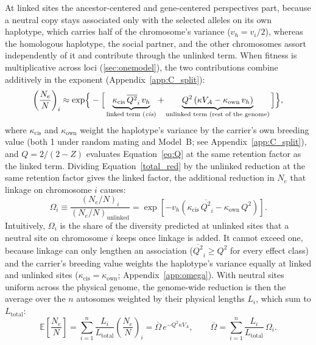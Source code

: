 \documentclass{article}
\begin{document}
At linked sites the ancestor-centered and gene-centered perspectives part, because a neutral copy stays associated only with the selected alleles on its own haplotype, which carries half of the chromosome's variance ($v_h = v_i/2$), whereas the homologous haplotype, the social partner, and the other chromosomes assort independently of it and contribute through the unlinked term. When fitness is multiplicative across loci (\autoref{sec:onemodel}), the two contributions combine additively in the exponent (Appendix~\ref{app:C_split}):
\begin{equation}
    \left(\frac{N_e}{N}\right)_i \approx \exp\!\Big\{-\Big[\underbrace{\kappa_\text{cis}\,\overline{Q^2}_i\,v_h}_{\text{linked term (\textit{cis})}} + \underbrace{Q^2\left(\kappa V_A - \kappa_\text{own}\,v_h\right)}_{\text{unlinked term (rest of the genome)}}\Big]\Big\}, \label{total_red}
\end{equation}
where $\kappa_\text{cis}$ and $\kappa_\text{own}$ weight the haplotype's variance by the carrier's own breeding value (both 1 under random mating and Model~B; see Appendix~\ref{app:C_split}), and $Q = 2/(2 - Z)$ evaluates Equation~\eqref{eq:Q} at the same retention factor as the linked term. Dividing Equation~\eqref{total_red} by the unlinked reduction at the same retention factor gives the linked factor, the additional reduction in $N_e$ that linkage on chromosome $i$ causes:
\begin{equation}
    \Omega_i \equiv \frac{(N_e/N)_i}{(N_e/N)_\text{unlinked}} = \exp\!\left[-v_h\left(\kappa_\text{cis}\,\overline{Q^2}_i - \kappa_\text{own}\,Q^2\right)\right]. \label{linked_penalty}
\end{equation}
Intuitively, $\Omega_i$ is the share of the diversity predicted at unlinked sites that a neutral site on chromosome $i$ keeps once linkage is added. It cannot exceed one, because linkage can only lengthen an association ($\overline{Q^2}_i \ge Q^2$ for every effect class) and the carrier's breeding value weights the haplotype's variance equally at linked and unlinked sites ($\kappa_\text{cis} = \kappa_\text{own}$; Appendix~\ref{app:omega}). With neutral sites uniform across the physical genome, the genome-wide reduction is then the average over the $n$ autosomes weighted by their physical lengths $L_i$, which sum to $L_\text{total}$:
\begin{equation}
    \mathbb{E}\left[\frac{N_e}{N}\right] = \sum_{i=1}^{n} \frac{L_i}{L_\text{total}} \left(\frac{N_e}{N}\right)_i = \overline{\Omega}\,e^{-Q^2\kappa V_A}, \qquad \overline{\Omega} = \sum_{i=1}^{n} \frac{L_i}{L_\text{total}}\, \Omega_i. \label{eq:genome_linked}
\end{equation}
\end{document}
